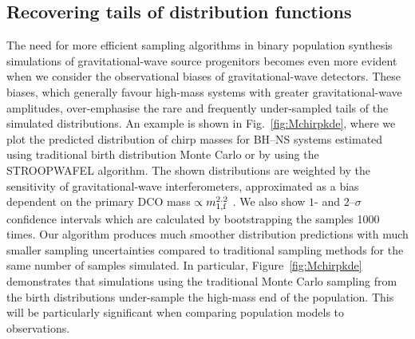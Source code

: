 \documentclass[a4paper,fleqn,usenatbib,useAMS,usedcolumn]{mnras}
\newcommand{\AISs}{\textsc{STROOPWAFEL}}
\begin{document}
\subsection{Recovering tails of distribution functions}
\label{subsec:results-tails-of-distributions}
The need for more efficient sampling algorithms in binary population synthesis simulations of gravitational-wave source progenitors becomes even more evident when we consider the observational biases of gravitational-wave detectors.   These biases, which generally favour high-mass systems with greater gravitational-wave amplitudes, over-emphasise the rare and frequently under-sampled tails of the simulated distributions.  An example is shown in  Fig.~\ref{fig:Mchirpkde}, where we plot the predicted distribution of  chirp masses for  BH--NS systems estimated  using traditional birth distribution Monte Carlo or by using the  \AISs{} algorithm. The shown distributions are  weighted by the sensitivity of gravitational-wave interferometers, approximated as a bias dependent on the primary DCO mass $\propto  m_{\rm{1,f}}^{2.2} $ \citep{2017ApJ...851L..25F}. We also show  $1$- and $2$--$\sigma$ confidence intervals which are calculated by bootstrapping the samples 1000 times. Our algorithm produces much smoother distribution predictions with much smaller sampling uncertainties compared to traditional sampling methods for the same number of samples simulated. 
In particular, Figure~\ref{fig:Mchirpkde} demonstrates that simulations using the traditional Monte Carlo sampling from the birth distributions under-sample the high-mass end of the population.  This will be particularly significant when comparing population models to observations.

\end{document}

